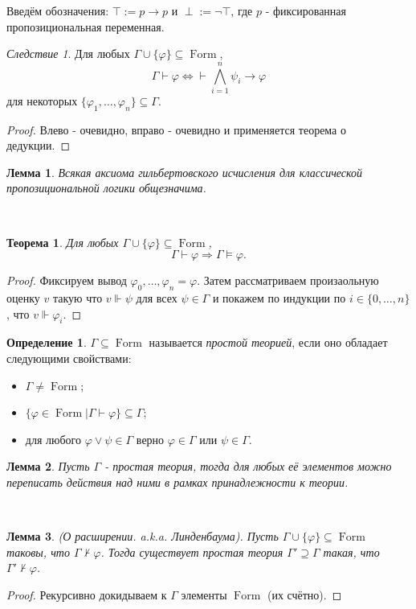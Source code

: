 \documentclass[a4paper,100pt]{article}
\theoremstyle{indented}
\newtheorem{theorem}{Теорема}
\newtheorem{lemma}{Лемма}
\theoremstyle{definition}
\newtheorem{defn}{Определение}
\theoremstyle{remark}
\newtheorem{cons}{Следствие}
\DeclareMathOperator{\form}{Form}
\begin{document}
Введём обозначения: $\top:= p\rightarrow p$ и $\perp := \neg \top$, где $p$ - фиксированная пропозициональная переменная.

\begin{cons}
  Для любых $\Gamma\cup \{\varphi\}\subseteq \form$, 
  \[
    \Gamma \vdash \varphi \Longleftrightarrow \vdash \bigwedge_{i=1}^n \psi_i\rightarrow \varphi
  \]
  для некоторых $\{\varphi_1, \ldots, \varphi_n\}\subseteq \Gamma$.
\end{cons}

\begin{proof}
  Влево - очевидно, вправо - очевидно и применяется теорема о дедукции.
\end{proof}

\begin{lemma}
  Всякая аксиома гильбертовского исчисления для классической пропозициональной логики общезначима.
\end{lemma}\ 


\begin{theorem}
  Для любых $\Gamma \cup \{\varphi\}\subseteq \form$, 
  \[
    \Gamma \vdash \varphi \Longrightarrow \Gamma \vDash \varphi. 
  \]
\end{theorem}

\begin{proof}
  Фиксируем вывод $\varphi_0, \ldots, \varphi_n = \varphi$. Затем рассматриваем произаольную оценку $v$ такую что $v\Vdash \psi$ для всех $\psi \in \Gamma$ и покажем по индукции по $i\in\{0, \ldots, n\}$, что $v\Vdash \varphi_i$.
\end{proof}

\begin{defn}
  $\Gamma \subseteq \form$ называется \textit{простой теорией}, если оно обладает следующими свойствами:

  \begin{itemize}
    \item $\Gamma \neq \form$; 
    \item $\{\varphi \in \form |\Gamma \vdash \varphi\}\subseteq \Gamma$; 
    \item для любого $\varphi \vee \psi \in \Gamma$ верно $\varphi \in \Gamma$ или $\psi \in \Gamma$. 
  \end{itemize}
\end{defn}

\begin{lemma}
  Пусть $\Gamma$ - простая теория, тогда для любых её элементов можно переписать действия над ними в рамках принадлежности к теории.
\end{lemma}\

\begin{lemma}
  (О расширении. a.k.a. Линденбаума). Пусть $\Gamma \cup \{\varphi \}\subseteq \form$ таковы, что $\Gamma \nvdash \varphi$. Тогда существует простая теория $\Gamma'\supseteq \Gamma$ такая, что $\Gamma' \nvdash \varphi$.
\end{lemma}

\begin{proof}
  Рекурсивно докидываем к $\Gamma$ элементы $\form$ (их счётно).
\end{proof}
\end{document}
